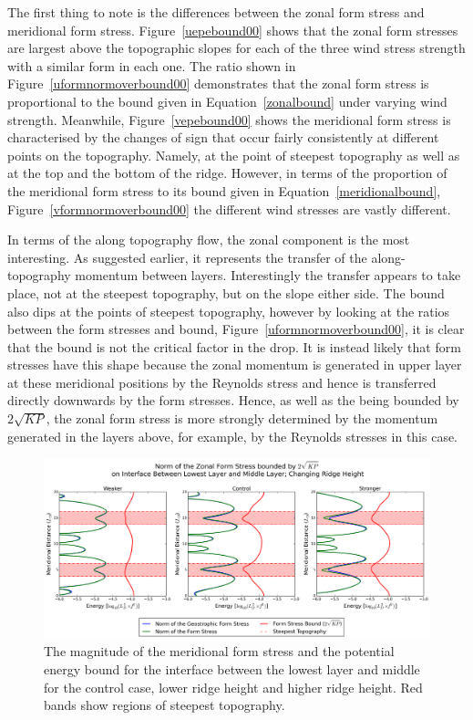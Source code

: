 \documentclass[12pt,a4paper]{report}
\newcommand*\figref[1]{Figure~\ref{#1}}
\newcommand*\equref[1]{Equation~\eqref{#1}}
\begin{document}
The first thing to note is the differences between the zonal form stress and meridional form stress. 
\figref{uepebound00} shows that the zonal form stresses are largest above the topographic slopes
for each of the three wind stress strength with a similar form in each one.
The ratio shown in \figref{uformnormoverbound00} demonstrates that the zonal form stress
is proportional to the bound given in \equref{zonalbound} under
varying wind strength. Meanwhile, \figref{vepebound00} shows the meridional form stress is characterised 
by the changes of sign that occur fairly consistently at
different points on the topography. Namely, at the point of steepest topography as
well as at the top and the bottom of the ridge. However, in terms
of the proportion of the meridional form stress to its bound given in \equref{meridionalbound},
 \figref{vformnormoverbound00} the different wind stresses are vastly different.
 
 In terms of the along topography
flow, the zonal component is the most interesting. As suggested earlier, it represents
the transfer of the along-topography momentum between layers. Interestingly the
transfer appears to take place, not at the steepest topography, but on the slope either
side. The bound also dips at the points of steepest topography, however by looking
at the ratios between the form stresses and bound, \figref{uformnormoverbound00}, it is clear
that the bound is not the critical factor in the drop. 
It is instead likely that form stresses have this
 shape because the zonal momentum is generated in upper layer at these meridional 
 positions by the Reynolds stress and hence is transferred directly downwards by the form
  stresses. Hence, as well as the being bounded by $2 \sqrt{KP}$, the zonal form stress
  is more strongly determined by the momentum generated in the layers above, for example,
  by the Reynolds stresses in this case.
  
  
  \begin{figure}
  	\centering
  	\includegraphics[width=\linewidth]{uepebound_1_0}
  	\caption{ The magnitude of the meridional form stress and the potential energy bound for the
  		interface between
  		the lowest layer and middle for the control case, lower ridge height and higher ridge height.  Red bands show regions of steepest topography.}
  	\label{uepebound10}
  \end{figure}
  
\end{document}
